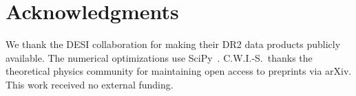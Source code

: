 \section*{Acknowledgments}

We thank the DESI collaboration for making their DR2 data products publicly available. The numerical optimizations use SciPy~\cite{ch3:scipy2020}. C.W.I.-S.\ thanks the theoretical physics community for maintaining open access to preprints via arXiv. This work received no external funding.

